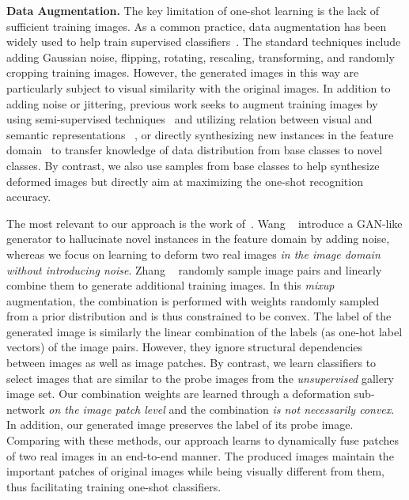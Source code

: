 \documentclass[10pt,letterpaper,twocolumn]{article}
\begin{document}
\noindent \textbf{Data Augmentation.} The key limitation of one-shot
learning is the lack of sufficient training images. As a common practice, data augmentation has been widely used to help train supervised classifiers~\cite{KrizhevskySH12,returnDevil2014BMVC,visualizing_network}.
The standard techniques include adding Gaussian noise, flipping, rotating, rescaling, transforming, and randomly cropping training images. However, the generated images in this way are particularly subject to visual similarity with the original images. In addition to adding noise or jittering, previous work seeks to augment training
images by using semi-supervised techniques~\cite{wang2016learningfrom,ren18fewshotssl,ladderNet} and utilizing relation between visual and semantic representations~\cite{semanticAugmentation} ,
or directly synthesizing
new instances in the feature domain~\cite{2017ICCVaug,imaginaryData,Delta-encoder,cogan} to transfer knowledge of data distribution from base classes to
novel classes. By contrast, we also use samples from base classes
to help synthesize deformed images but directly aim at maximizing
the one-shot recognition accuracy.

The most relevant to our approach is the work of~\cite{imaginaryData,mixup}. Wang \etal~\cite{imaginaryData} introduce a GAN-like generator
to hallucinate novel instances in the feature domain by adding noise, whereas we focus
on learning to deform two real images {\em in the image domain without introducing noise}. Zhang \etal~\cite{mixup} randomly sample image pairs and linearly combine them to generate additional training images. In this {\em mixup} augmentation, the combination is performed with weights randomly sampled from a prior distribution and is thus constrained to be convex. The label of the generated image is similarly the linear combination of the labels (as one-hot label vectors) of the image pairs. However, they ignore structural dependencies between images as well as image patches. By contrast, we  learn classifiers to select images that are similar to the probe images from the {\em unsupervised} gallery image set. Our combination weights are learned through a deformation sub-network {\em on the image patch level} and the combination {\em is not necessarily convex}. In addition, our generated image preserves the label of its probe image. Comparing
with these methods, our approach learns to dynamically fuse patches
of two real images in an end-to-end manner. The produced images
maintain the important patches of original images while being visually different from them, thus facilitating training one-shot classifiers.
\end{document}
